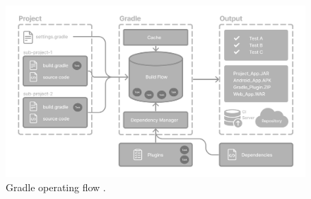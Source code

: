 \begin{figure}
    \includegraphics[width=1.0\linewidth]{./images/gradle_basics.png}
    \caption[Gradle operating flow.]{Gradle operating flow \protect\cite{GradleBasics}.}
    \label{fig:gradleBasics}
\end{figure}




